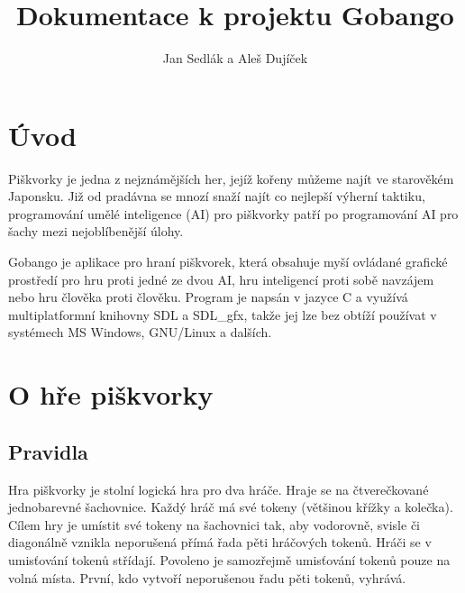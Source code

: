 \documentclass[a4paper,11pt,titlepage]{article}
\author{Jan Sedlák a Aleš Dujíček}
\title{Dokumentace k projektu Gobango}
\begin{document}
\maketitle
\tableofcontents
\newpage
\section{Úvod}
Piškvorky je jedna z nejznámějších her, jejíž kořeny můžeme najít ve starověkém Japonsku. Již od pradávna se mnozí snaží najít co nejlepší výherní taktiku, programování umělé inteligence (AI) pro piškvorky patří po programování AI pro šachy mezi nejoblíbenější úlohy. 

Gobango je aplikace pro hraní piškvorek, která obsahuje myší ovládané grafické prostředí pro hru proti jedné ze dvou AI, hru inteligencí proti sobě navzájem nebo hru člověka proti člověku. Program je napsán v jazyce C a využívá multiplatformní knihovny SDL a SDL\_gfx, takže jej lze bez obtíží používat v systémech MS Windows, GNU/Linux a dalších.


\newpage

\section{O hře piškvorky}
\subsection{Pravidla}
Hra piškvorky je stolní logická hra pro dva hráče. Hraje se na čtve\-reč\-ko\-va\-né jednobarevné šachovnice. Každý hráč má své tokeny (většinou křížky a kolečka). Cílem hry je umístit své tokeny na šachovnici tak, aby vodorovně, svisle či diagonálně vznikla neporušená přímá řada pěti hráčových tokenů. Hráči se v umisťování tokenů střídají. Povoleno je samozřejmě umisťování tokenů pouze na volná místa. První, kdo vytvoří neporušenou řadu pěti tokenů, vyhrává. 
\end{document}
